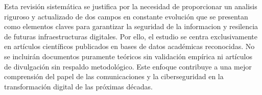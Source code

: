 Esta revisión sistemática se justifica por la necesidad de proporcionar un analisis riguroso y actualizado de dos campos en constante evolución que se presentan como elementos claves para garantizar la seguridad de la informacion y resilencia de futuras infraestructuras digitales. Por ello, el estudio se centra exclusivamente en artículos científicos publicados en bases de datos académicas reconocidas. No se incluirán documentos puramente teóricos sin validación empírica ni artículos de divulgación sin respaldo metodológico. Este enfoque contribuye a una mejor comprensión del papel de las comunicaciones y la ciberseguridad en la transformación digital de las próximas décadas.

